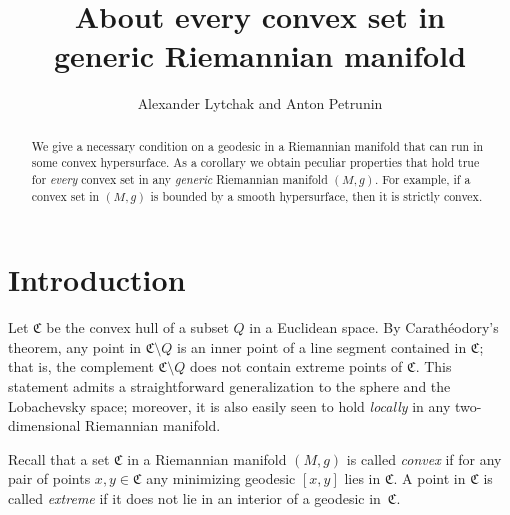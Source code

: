 \documentclass[a4paper,10pt]{article}
\def\thetitle{About every convex set in\\ generic Riemannian manifold}
\begin{document}

\title{\thetitle}
\author{Alexander Lytchak and Anton Petrunin}
\date{}
\maketitle

\begin{abstract}
We give a necessary condition on a geodesic in a Riemannian manifold that can run in some convex hypersurface.
As a corollary we obtain peculiar properties that hold true for \emph{every} convex set in any \emph{generic} Riemannian manifold $(M,g)$.
For example, if a convex set in $(M,g)$ is bounded by a smooth hypersurface, then it is strictly convex.
\end{abstract}








\section{Introduction}
Let $\mathfrak{C}$ be the convex hull of a subset $Q$ in a Euclidean space.
By Carathéodory's theorem, any point in $\mathfrak{C}\setminus Q$ is an inner point of a line segment contained in $\mathfrak{C}$;
that is, the complement $\mathfrak{C} \setminus Q$ does not contain extreme points of $\mathfrak{C}$.
This statement admits a straightforward generalization to the sphere and the  Lobachevsky space; moreover, it  is also easily seen to hold \emph{locally} in any two-dimensional Riemannian manifold.

Recall that a set $\mathfrak{C}$ in a Riemannian manifold $(M,g)$ is called \emph{convex} if for any pair of points $x,y\in \mathfrak{C}$ any minimizing geodesic $[x,y]$ lies in $\mathfrak{C}$.
A point in $\mathfrak{C}$ is called \emph{extreme} if it does not lie in an interior of a geodesic in~$\mathfrak{C}$.
\end{document}
